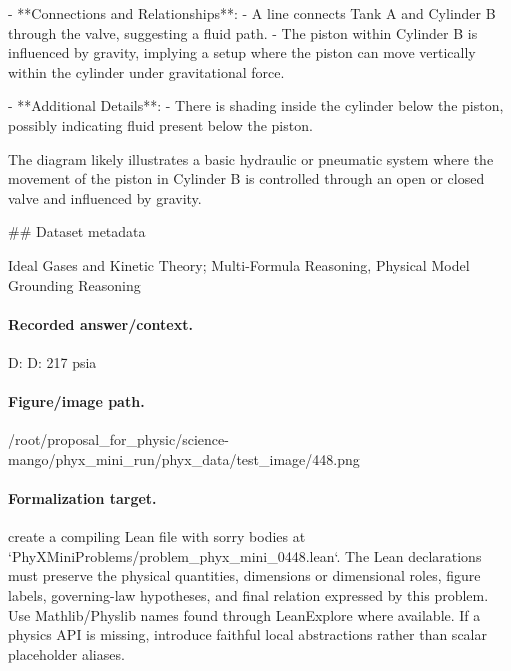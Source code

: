 - **Connections and Relationships**:
  - A line connects Tank A and Cylinder B through the valve, suggesting a fluid path.
  - The piston within Cylinder B is influenced by gravity, implying a setup where the piston can move vertically within the cylinder under gravitational force.

- **Additional Details**:
  - There is shading inside the cylinder below the piston, possibly indicating fluid present below the piston.

The diagram likely illustrates a basic hydraulic or pneumatic system where the movement of the piston in Cylinder B is controlled through an open or closed valve and influenced by gravity.

\#\# Dataset metadata

Ideal Gases and Kinetic Theory; Multi-Formula Reasoning, Physical Model Grounding Reasoning

\paragraph{Recorded answer/context.}
D: D: 217 psia

\paragraph{Figure/image path.}
/root/proposal\_for\_physic/science-mango/phyx\_mini\_run/phyx\_data/test\_image/448.png

\paragraph{Formalization target.}
create a compiling Lean file with sorry bodies at `PhyXMiniProblems/problem\_phyx\_mini\_0448.lean`. The Lean declarations must preserve the physical quantities, dimensions or dimensional roles, figure labels, governing-law hypotheses, and final relation expressed by this problem.
Use Mathlib/Physlib names found through LeanExplore where available. If a physics API is missing, introduce faithful local abstractions rather than scalar placeholder aliases.

